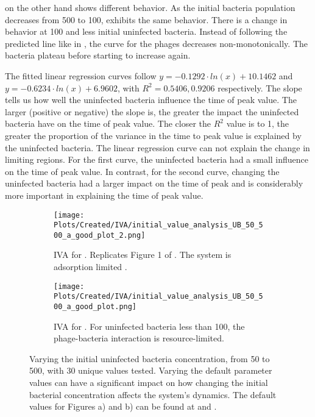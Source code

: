  on the other hand shows different behavior. 
As the initial bacteria population decreases from 500 to 100,  exhibits the same behavior. 
There is a change in behavior at 100 and less initial uninfected bacteria. 
Instead of following the predicted line like in , the curve for the phages decreases non-monotonically.
The bacteria plateau before starting to increase again. 

The fitted linear regression curves follow $y = -0.1292\cdot ln(x) + 10.1462$ and $y = -0.6234\cdot ln(x)+6.9602$, with $R^2=0.5406, 0.9206$ respectively. 
The slope tells us how well the uninfected bacteria influence the time of peak value. 
The larger (positive or negative) the slope is, the greater the impact the uninfected bacteria have on the time of peak value. 
The closer the $R^2$ value is to 1, the greater the proportion of the variance in the time to peak value is explained by the uninfected bacteria. 
The linear regression curve can not explain the change in limiting regions. 
For the first curve, the uninfected bacteria had a small influence on the time of peak value. In contrast, for the second curve, changing the uninfected bacteria had a larger impact on the time of peak and is considerably more important in explaining the time of peak value. 

\begin{figure}
    \centering
    \begin{subfigure}{1\linewidth}
        \centering
        \texttt{[image: Plots/Created/IVA/initial\_value\_analysis\_UB\_50\_500\_a\_good\_plot\_2.png]}
        \caption{
            IVA for . 
            Replicates Figure 1 of \citet{mullaExtremeDiversityPhage2024}. 
            The system is adsorption limited \cite{mullaExtremeDiversityPhage2024}. 
        }
        \label{fig:created:initial_value_analysis_UB_50_500_a_good_plot_2}
    \end{subfigure}
    \hfill
    \begin{subfigure}{1\linewidth}
        \centering
        \texttt{[image: Plots/Created/IVA/initial\_value\_analysis\_UB\_50\_500\_a\_good\_plot.png]}
        \caption{
            IVA for . 
            For uninfected bacteria less than 100, the phage-bacteria interaction is resource-limited. 
        }
        \label{fig:created:initial_value_analysis_UB_50_500_a_good_plot}
    \end{subfigure}
    \caption{
        Varying the initial uninfected bacteria concentration, from 50 to 500, with 30 unique values tested. 
        Varying the default parameter values can have a significant impact on how changing the initial bacterial concentration affects the system's dynamics. 
        The default values for Figures a) and b) can be found at  and . 
    }
\end{figure}

